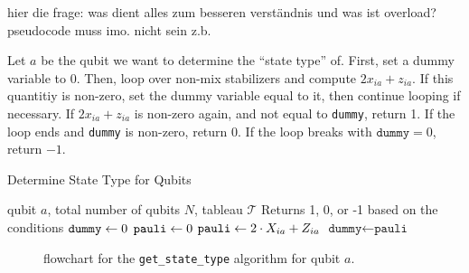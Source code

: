 \textcolor{kw-olive}{hier die frage: was dient alles zum besseren
verst\"andnis und was ist overload? pseudocode muss imo. nicht sein z.b.}

\begin{alg}\label{alg:get_state_type}
  Let $a$ be the qubit we want to determine the \enquote{state type} of. First,
  set a dummy variable to $0$. Then, loop over non-mix stabilizers and compute
  $2x_{ia} + z_{ia}$. If this quantitiy is non-zero, set the dummy variable
  equal to it, then continue looping if necessary. If $2x_{ia}+z_{ia}$ is
  non-zero again, and not equal to \verb|dummy|, return 1. If the loop ends and
  \verb|dummy| is non-zero, return 0. If the loop breaks with
  $\texttt{dummy}=0$, return $-1$.
\end{alg}
\begin{algorithm}[H]
\caption{Determine State Type for Qubits}
\label{alg:get_state_type1}
\begin{algorithmic}[1]
\REQUIRE qubit $a$, total number of qubits $N$, tableau $\mathcal{T}$
\ENSURE Returns 1, 0, or -1 based on the conditions
\STATE $\verb|dummy| \leftarrow 0$
\STATE $\verb|pauli| \leftarrow 0$
  \STATE $\verb|pauli| \leftarrow 2\cdot X_{ia} + Z_{ia}$
        \STATE $\texttt{dummy} \leftarrow \texttt{pauli}$
    \ENDIF
\ENDFOR
{}
\ELSE
\ENDIF
\end{algorithmic}
\end{algorithm}

\begin{figure}[H]
  \centering
  
  \caption{flowchart for the \texttt{get\_state\_type} algorithm for qubit $a$.}
  \label{fig:statetype-diag}
\end{figure}

